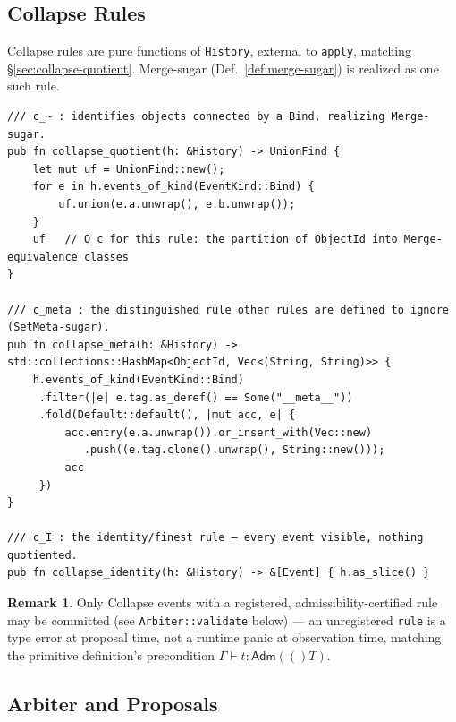\documentclass[12pt]{article}
\theoremstyle{definition}
\newtheorem{remark}{Remark}
\newcommand{\Adm}[1]{\mathsf{Adm}(#1)}
\begin{document}
\subsection{Collapse Rules}

Collapse rules are pure functions of \texttt{History}, external to \texttt{apply}, matching \S\ref{sec:collapse-quotient}. Merge-sugar (Def.~\ref{def:merge-sugar}) is realized as one such rule.

\begin{verbatim}
/// c_~ : identifies objects connected by a Bind, realizing Merge-sugar.
pub fn collapse_quotient(h: &History) -> UnionFind {
    let mut uf = UnionFind::new();
    for e in h.events_of_kind(EventKind::Bind) {
        uf.union(e.a.unwrap(), e.b.unwrap());
    }
    uf   // O_c for this rule: the partition of ObjectId into Merge-equivalence classes
}

/// c_meta : the distinguished rule other rules are defined to ignore (SetMeta-sugar).
pub fn collapse_meta(h: &History) -> std::collections::HashMap<ObjectId, Vec<(String, String)>> {
    h.events_of_kind(EventKind::Bind)
     .filter(|e| e.tag.as_deref() == Some("__meta__"))
     .fold(Default::default(), |mut acc, e| {
         acc.entry(e.a.unwrap()).or_insert_with(Vec::new)
            .push((e.tag.clone().unwrap(), String::new()));
         acc
     })
}

/// c_I : the identity/finest rule — every event visible, nothing quotiented.
pub fn collapse_identity(h: &History) -> &[Event] { h.as_slice() }
\end{verbatim}

\begin{remark}
Only Collapse events with a registered, admissibility-certified rule may be committed (see \texttt{Arbiter::validate} below) — an unregistered \texttt{rule} is a type error at proposal time, not a runtime panic at observation time, matching the primitive definition's precondition $\Gamma \vdash t : \Adm(T)$.
\end{remark}

\subsection{Arbiter and Proposals}
\end{document}
